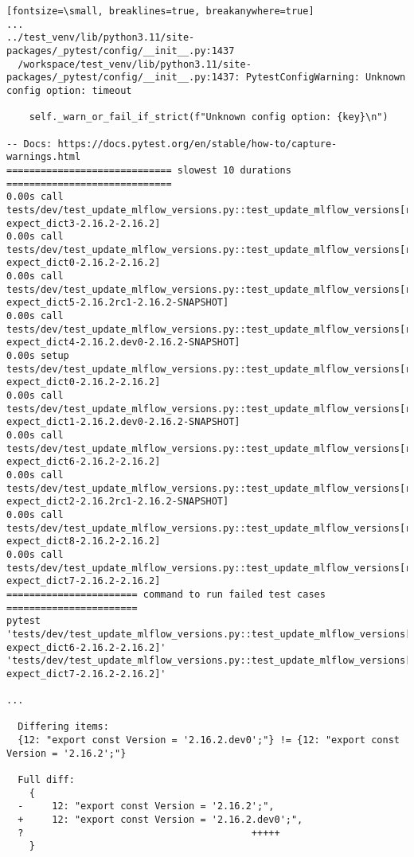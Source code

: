 \begin{verbatim}[fontsize=\small, breaklines=true, breakanywhere=true]
...
../test_venv/lib/python3.11/site-packages/_pytest/config/__init__.py:1437
  /workspace/test_venv/lib/python3.11/site-packages/_pytest/config/__init__.py:1437: PytestConfigWarning: Unknown config option: timeout
  
    self._warn_or_fail_if_strict(f"Unknown config option: {key}\n")

-- Docs: https://docs.pytest.org/en/stable/how-to/capture-warnings.html
============================= slowest 10 durations =============================
0.00s call     tests/dev/test_update_mlflow_versions.py::test_update_mlflow_versions[replace_java_pom_xml-expect_dict3-2.16.2-2.16.2]
0.00s call     tests/dev/test_update_mlflow_versions.py::test_update_mlflow_versions[replace_java-expect_dict0-2.16.2-2.16.2]
0.00s call     tests/dev/test_update_mlflow_versions.py::test_update_mlflow_versions[replace_java_pom_xml-expect_dict5-2.16.2rc1-2.16.2-SNAPSHOT]
0.00s call     tests/dev/test_update_mlflow_versions.py::test_update_mlflow_versions[replace_java_pom_xml-expect_dict4-2.16.2.dev0-2.16.2-SNAPSHOT]
0.00s setup    tests/dev/test_update_mlflow_versions.py::test_update_mlflow_versions[replace_java-expect_dict0-2.16.2-2.16.2]
0.00s call     tests/dev/test_update_mlflow_versions.py::test_update_mlflow_versions[replace_java-expect_dict1-2.16.2.dev0-2.16.2-SNAPSHOT]
0.00s call     tests/dev/test_update_mlflow_versions.py::test_update_mlflow_versions[replace_js-expect_dict6-2.16.2-2.16.2]
0.00s call     tests/dev/test_update_mlflow_versions.py::test_update_mlflow_versions[replace_java-expect_dict2-2.16.2rc1-2.16.2-SNAPSHOT]
0.00s call     tests/dev/test_update_mlflow_versions.py::test_update_mlflow_versions[replace_pyproject_toml-expect_dict8-2.16.2-2.16.2]
0.00s call     tests/dev/test_update_mlflow_versions.py::test_update_mlflow_versions[replace_python-expect_dict7-2.16.2-2.16.2]
======================= command to run failed test cases =======================
pytest 'tests/dev/test_update_mlflow_versions.py::test_update_mlflow_versions[replace_js-expect_dict6-2.16.2-2.16.2]' 'tests/dev/test_update_mlflow_versions.py::test_update_mlflow_versions[replace_python-expect_dict7-2.16.2-2.16.2]'

...
  
  Differing items:
  {12: "export const Version = '2.16.2.dev0';"} != {12: "export const Version = '2.16.2';"}
  
  Full diff:
    {
  -     12: "export const Version = '2.16.2';",
  +     12: "export const Version = '2.16.2.dev0';",
  ?                                        +++++
    }


\end{verbatim}
